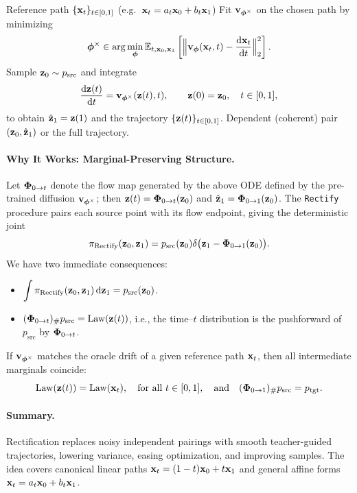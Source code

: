 \begin{algorithm}[H]
\caption{\texttt{Rectify} Operation\label{alg:Rectify}}
\begin{algorithmic}[1]
\Require Reference path $\{{\mathbf{x}}_t\}_{t\in[0,1]}$ (e.g.\ ${\mathbf{x}}_t=a_t{\mathbf{x}}_0+b_t{\mathbf{x}}_1$)
\State {} Fit ${\mathbf{v}}_{{\bm{\phi}}^\times}$ on the chosen path by minimizing
\[
{\bm{\phi}}^\times \in \arg\min_{{\bm{\phi}}} 
\mathbb{E}_{t,{\mathbf{x}}_0,{\mathbf{x}}_1} \left[\Big\|{\mathbf{v}}_{{\bm{\phi}}}({\mathbf{x}}_t,t)-\frac{\mathop{}\!\mathrm{d} {\mathbf{x}}_t}{\mathop{}\!\mathrm{d} t}\Big\|_2^2\right].
\]
\State {} Sample ${\mathbf{z}}_0 \sim p_{\text{src}}$ and integrate
\[
\frac{\mathop{}\!\mathrm{d} {\mathbf{z}}(t)}{\mathop{}\!\mathrm{d} t}={\mathbf{v}}_{{\bm{\phi}}^\times}({\mathbf{z}}(t),t),\qquad {\mathbf{z}}(0)={\mathbf{z}}_0,\quad t\in[0,1],
\]
to obtain $\hat{{\mathbf{z}}}_1={\mathbf{z}}(1)$ and the trajectory $\{{\mathbf{z}}(t)\}_{t\in[0,1]}$.
\Ensure Dependent (coherent) pair $({\mathbf{z}}_0,\hat{{\mathbf{z}}}_1)$ or the full trajectory.
\end{algorithmic}
\end{algorithm}

\paragraph{Why It Works: Marginal-Preserving Structure.}
Let ${\bm{\Phi}}_{0\to t}$ denote the flow map generated by the above ODE defined by the pre-trained diffusion ${\mathbf{v}}_{{\bm{\phi}}^\times}$; then ${\mathbf{z}}(t)={\bm{\Phi}}_{0\to t}({\mathbf{z}}_0)$ and $\hat{{\mathbf{z}}}_1={\bm{\Phi}}_{0\to 1}({\mathbf{z}}_0)$. The \texttt{Rectify} procedure pairs each source point with its flow endpoint, giving the deterministic joint
\[
\pi_{\text{Rectify}}({\mathbf{z}}_0,{\mathbf{z}}_1)
= p_{\text{src}}({\mathbf{z}}_0) \delta \big({\mathbf{z}}_1-{\bm{\Phi}}_{0\to 1}({\mathbf{z}}_0)\big).
\]
We have two immediate consequences:
\begin{itemize}
    \item {} 
    $\displaystyle \int \pi_{\text{Rectify}}({\mathbf{z}}_0,{\mathbf{z}}_1) \mathop{}\!\mathrm{d} {\mathbf{z}}_1
    = p_{\text{src}}({\mathbf{z}}_0)$.
    \item {} 
    $\displaystyle ({\bm{\Phi}}_{0\to t})_{\#}p_{\text{src}}=\mathrm{Law}({\mathbf{z}}(t))$, i.e., the time–$t$ distribution is the pushforward of $p_{\text{src}}$ by ${\bm{\Phi}}_{0\to t}$.
\end{itemize}
If ${\mathbf{v}}_{{\bm{\phi}}^\times}$ matches the oracle drift of a given reference path ${\mathbf{x}}_t$, then all intermediate marginals coincide:
\[
\mathrm{Law}({\mathbf{z}}(t))=\mathrm{Law}({\mathbf{x}}_t),\quad \text{for all }t\in[0,1],
\quad\text{and}\quad
({\bm{\Phi}}_{0\to 1})_{\#}p_{\mathrm{src}}=p_{\mathrm{tgt}}.
\]


\paragraph{Summary.}
Rectification replaces noisy independent pairings with smooth teacher-guided trajectories, lowering variance, easing optimization, and improving samples. The idea covers canonical linear paths ${\mathbf{x}}_t=(1-t){\mathbf{x}}_0+t{\mathbf{x}}_1$ and general affine forms ${\mathbf{x}}_t=a_t{\mathbf{x}}_0+b_t{\mathbf{x}}_1$.

